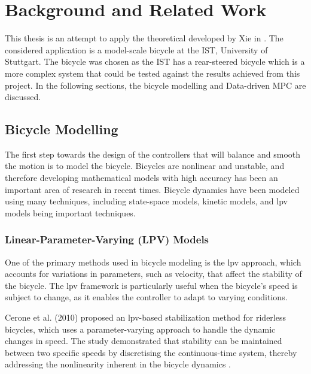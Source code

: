 \chapter{Background and Related Work}
This thesis is an attempt to apply the theoretical  developed by Xie in \cite{xie2024}. The considered application is a model-scale bicycle at the \gls{IST}, University of Stuttgart. The bicycle was chosen as the \gls{IST} has a rear-steered bicycle which is a more complex system that could be tested against the results achieved from this project. In the following sections, the bicycle modelling and Data-driven MPC are discussed.

\section{Bicycle Modelling}

The first step towards the design of the controllers that will balance and smooth the motion is to model the bicycle. Bicycles are nonlinear and unstable, and therefore developing mathematical models with high accuracy has been an important area of research in recent times. Bicycle dynamics have been modeled using many techniques, including state-space models, kinetic models, and \gls{lpv} models being important techniques.

\subsection{Linear-Parameter-Varying (LPV) Models}
One of the primary methods used in bicycle modeling is the \gls{lpv} approach, which accounts for variations in parameters, such as velocity, that affect the stability of the bicycle. The \gls{lpv} framework is particularly useful when the bicycle's speed is subject to change, as it enables the controller to adapt to varying conditions.

Cerone et al. (2010) proposed an \gls{lpv}-based stabilization method for riderless bicycles, which uses a parameter-varying approach to handle the dynamic changes in speed. The study demonstrated that stability can be maintained between two specific speeds by discretising the continuous-time system, thereby addressing the nonlinearity inherent in the bicycle dynamics \cite{cerone2010StabilizationOA}.

